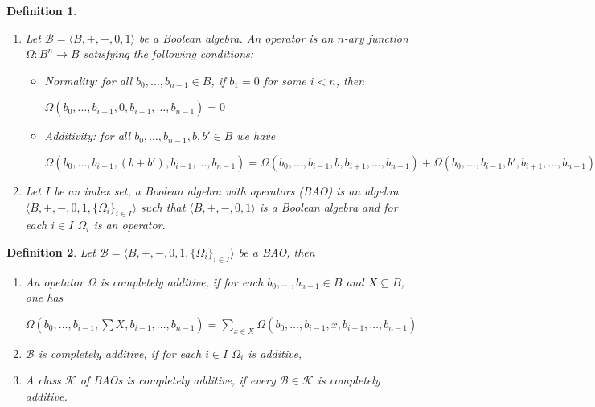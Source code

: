\documentclass[a4paper]{article}
\theoremstyle{defin}
\newtheorem{defin}{Definition}
\theoremstyle{theorem}
\theoremstyle{prop}
\theoremstyle{lemma}
\theoremstyle{fact}
\theoremstyle{ex}
\theoremstyle{col}
\begin{document}
\begin{defin}

$ $

  \begin{enumerate}
    \item Let $\mathcal{B} = \langle B, +, -, 0, 1 \rangle$ be a Boolean algebra. An operator is an $n$-ary function $\Omega : B^n \to B$ satisfying the following conditions:
    \begin{itemize}
      \item Normality: for all $b_0, \dots, b_{n - 1} \in B$, if $b_1 = 0$ for some $i < n$, then

\begin{center}
      $\Omega(b_0, \dots, b_{i - 1}, 0, b_{i+1}, \dots, b_{n - 1}) = 0$
\end{center}
      \item Additivity: for all $b_0, \dots, b_{n - 1}, b, b' \in B$ we have
      \begin{center}
        $\Omega(b_0, \dots, b_{i - 1}, (b + b'), b_{i+1}, \dots, b_{n - 1}) = \Omega(b_0, \dots, b_{i - 1}, b, b_{i+1}, \dots, b_{n - 1}) + \Omega(b_0, \dots, b_{i - 1}, b', b_{i+1}, \dots, b_{n - 1})$
      \end{center}
    \end{itemize}
    \item Let $I$ be an index set, a Boolean algebra with operators (BAO) is an algebra $\langle B, +, -, 0, 1, \{ \Omega_{i} \}_{i \in I} \rangle$ such that $\langle B, +, -, 0, 1 \rangle$ is a Boolean algebra and for each $i \in I$ $\Omega_{i}$ is an operator.
  \end{enumerate}
\end{defin}

\begin{defin} Let $\mathcal{B} = \langle B, +, -, 0, 1, \{ \Omega_{i} \}_{i \in I} \rangle$ be a BAO, then

  \begin{enumerate}
    \item An opetator $\Omega$ is completely additive, if for each $b_0, \dots, b_{n - 1} \in B$ and $X \subseteq B$, one has

    \begin{center}
      $\Omega(b_0, \dots, b_{i-1}, \sum X, b_{i+1}, \dots, b_{n - 1}) = \sum \limits_{x \in X} \Omega(b_0, \dots, b_{i-1}, x, b_{i+1}, \dots, b_{n - 1})$
    \end{center}
    \item $\mathcal{B}$ is completely additive, if for each $i \in I$ $\Omega_{i}$ is additive,
    \item A class $\mathcal{K}$ of BAOs is completely additive, if every $\mathcal{B} \in \mathcal{K}$ is completely additive.
  \end{enumerate}
\end{defin}
\end{document}
